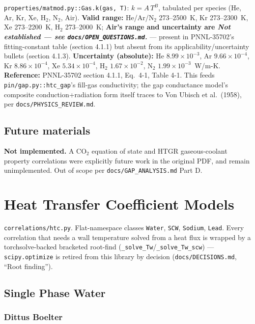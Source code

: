 \documentclass[11pt]{article}
\newcommand{\code}[1]{\texttt{#1}}
\newcommand{\notimpl}{\textbf{Not implemented.}}
\newcommand{\notest}{\textit{Not established --- see \code{docs/OPEN\_QUESTIONS.md}.}}
\begin{document}
\code{properties/matmod.py::Gas.k(gas, T)}: $k = A\,T^B$, tabulated per species (He, Ar,
Kr, Xe, H$_2$, N$_2$, Air). \textbf{Valid range:} He/Ar/N$_2$ 273--2500~K, Kr
273--2300~K, Xe 273--2200~K, H$_2$ 273--2000~K; \textbf{Air's range and uncertainty are
\notest{}} --- present in PNNL-35702's fitting-constant table (section 4.1.1) but absent
from its applicability/uncertainty bullets (section 4.1.3). \textbf{Uncertainty
(absolute):} He $8.99\times10^{-3}$, Ar $9.66\times10^{-4}$, Kr $8.86\times10^{-4}$, Xe
$5.34\times10^{-4}$, H$_2$ $1.67\times10^{-2}$, N$_2$ $1.99\times10^{-3}$~W/m-K.
\textbf{Reference:} PNNL-35702 section 4.1.1, Eq.\ 4-1, Table 4-1. This feeds
\code{pin/gap.py::htc\_gap}'s fill-gas conductivity; the gap conductance model's
composite conduction+radiation form itself traces to Von Ubisch et al.\ (1958), per
\code{docs/PHYSICS\_REVIEW.md}.

\subsection{Future materials}

\notimpl{} A CO$_2$ equation of state and HTGR gaseous-coolant property correlations
were explicitly future work in the original PDF, and remain unimplemented. Out of
scope per \code{docs/GAP\_ANALYSIS.md} Part D.

\section{Heat Transfer Coefficient Models}

\code{correlations/htc.py}. Flat-namespace classes \code{Water}, \code{SCW},
\code{Sodium}, \code{Lead}. Every correlation that needs a wall temperature solved from
a heat flux is wrapped by a torchsolve-backed bracketed root-find
(\code{\_solve\_Tw}/\code{\_solve\_Tw\_scw}) --- \code{scipy.optimize} is retired from
this library by decision (\code{docs/DECISIONS.md}, ``Root finding'').

\subsection{Single Phase Water}

\subsubsection{Dittus Boelter}
\end{document}
